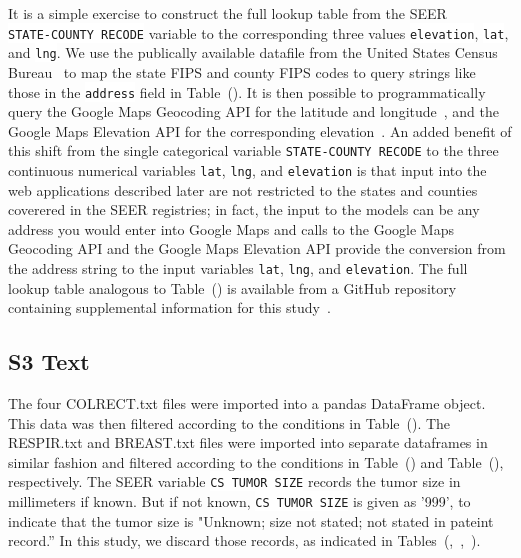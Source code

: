 \documentclass[10pt,letterpaper]{article}
\newcommand{\codewhite}[1]{\colorbox{white}{\texttt{#1}}}
\begin{document}
It is a simple exercise to construct the full lookup table from the SEER \\  \codewhite{STATE-COUNTY RECODE} variable to the corresponding three values \codewhite{elevation}, \codewhite{lat}, and \codewhite{lng}. We use the publically available datafile from the United States Census Bureau~\cite{census} to map the state FIPS and county FIPS codes to query strings like those in the \codewhite{address} field in Table~(). 
It is then possible to programmatically query the Google Maps Geocoding API for the latitude and longitude~\cite{geocode}, and the Google Maps Elevation API for the corresponding elevation~\cite{elevation}.
An added benefit of this shift from the single categorical variable \codewhite{STATE-COUNTY RECODE} to the three continuous numerical variables \codewhite{lat}, \codewhite{lng}, and \codewhite{elevation} is that input into the web applications described later are not restricted to the states and counties coverered in the SEER registries; in fact, the input to the models can be any address you would enter into Google Maps and calls to the Google Maps Geocoding API and the Google Maps Elevation API provide the conversion from the address string to the input variables \codewhite{lat}, \codewhite{lng}, and \codewhite{elevation}. The full lookup table analogous to Table~() is available from a GitHub repository containing supplemental information for this study~\cite{supp}. 



\subsection*{S3 Text}
\label{S3_Text}

 The four COLRECT.txt files were imported into a pandas DataFrame object.
This data was then filtered according to the conditions in Table~().
The RESPIR.txt and BREAST.txt files were imported into separate dataframes in similar fashion and filtered according
to the conditions in Table~() and Table~(), respectively.
The SEER variable \codewhite{CS TUMOR SIZE} records the tumor size in millimeters if known. But if not known, \codewhite{CS TUMOR SIZE} is given as '999', to indicate that the tumor size is "Unknown; size not stated; not stated in pateint record.'' In this study, we discard those records, as indicated in Tables~(,~,~).
\end{document}
